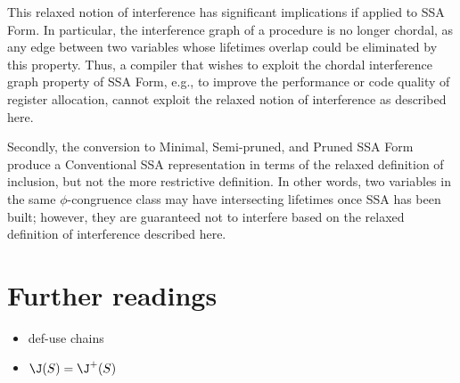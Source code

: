 This relaxed notion of interference has significant implications if
applied to SSA Form. In particular, the interference graph of a procedure
is no longer chordal, as any edge between two variables whose lifetimes
overlap could be eliminated by this property. Thus, a compiler that
wishes to exploit the chordal interference graph property of SSA Form, 
e.g., to improve the performance or code quality of register allocation,
cannot exploit the relaxed notion of interference as described here.

Secondly, the conversion to Minimal, Semi-pruned, and Pruned SSA Form
produce a Conventional SSA representation in terms of the relaxed 
definition of inclusion, but not the more restrictive definition. In other
words, two variables in the same $\phi$-congruence class may have 
intersecting lifetimes once SSA has been built; however, they are
guaranteed not to interfere based on the relaxed definition
of interference described here. 



\section{Further readings}
\begin{itemize}
\item def-use chains
\item $\J(S)=\J^+(S)$
\end{itemize}

